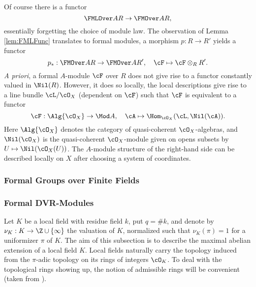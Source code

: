\documentclass[../main.tex]{subfiles}
\begin{document}
Of course there is a functor 
\begin{equation*}
  \FMLOver AR \to \FMOver AR,
\end{equation*}
essentially forgetting the choice of module law. The observation of Lemma 
\ref{lem:FMLFunc} translates to formal modules, a morphism $p : R \to R'$ 
yields a functor 
\begin{equation*}
  p_*: \FMOver AR \to \FMOver A{R'}, \quad \cF \mapsto \cF \otimes_R R'.
\end{equation*}
\textit{A priori}, a formal $A$-module $\cF$ over $R$ does not give rise to a
functor constantly valued in $\Nil(R)$. However, it does so locally, 
the local descriptions give rise to a line bundle $\cL/\cO_X$ (dependent on $\cF$)
such that $\cF$ is equivalent to a functor
\begin{equation*}
  \cF: \Alg {\cO_X} \to \Mod A, \quad \cA \mapsto \Hom_{\cO_X}(\cL,
  \Nil(\cA)).
\end{equation*}
Here $\Alg {\cO_X}$ denotes the category of quasi-coherent $\cO_X$-algebras,
and $\Nil(\cO_X)$ is the quasi-coherent $\cO_X$-module given on 
opens subsets by $U \mapsto \Nil(\cO_X(U))$. The $A$-module structure 
of the right-hand side can be described locally on $X$ after choosing 
a system of coordinates.

\subsubsection{Formal Groups over Finite Fields}


\subsubsection{Formal DVR-Modules}
Let $K$ be a local field with residue field $k$, put $q = \# k$, and 
denote by $\nu_K: K \to \Z \cup \{\infty\}$ the valuation of $K$, normalized
such that $\nu_K(\pi) = 1$ for a uniformizer $\pi$ of $K$.
The aim of this subsection is to describe the maximal abelian extension of
a local field $K$.
Local fields naturally carry the topology induced from the $\pi$-adic 
topology on its rings of integers $\cO_K$. To deal with the topological 
rings showing up, the notion of admissible rings will be convenient (taken from
\cite[Tag 07E8]{stacks-project}).
\end{document}
